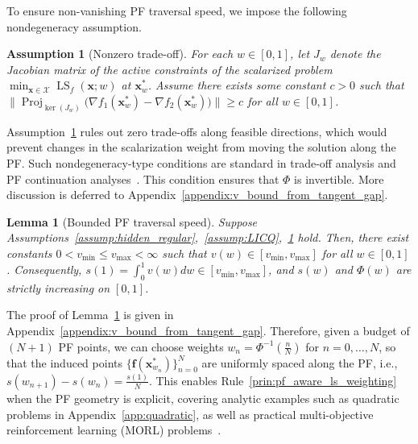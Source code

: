 \documentclass{article}
\newtheorem{assumption}{Assumption}
\newtheorem{lemma}{Lemma}
\newcommand{\bx}{\mathbf{x}}
\newcommand{\X}{\mathcal{X}}
\newcommand{\LS}{\operatorname{LS}}
\newcommand{\f}{\mathbf{f}}
\newcommand{\Farc}{\Phi}
\newcommand{\Proj}{\operatorname{Proj}}
\begin{document}
To ensure non-vanishing PF traversal speed, we impose the following nondegeneracy assumption.
\begin{assumption}[Nonzero trade-off]
\label{assump:tangent_gap}
For each $w\in[0,1]$, let $J_w$ denote the Jacobian matrix of the active constraints of the scalarized problem $\min_{\bx\in\X}\LS_f(\bx;w)$ at $\bx_w^*$. Assume there exists some constant $c>0$ such that $\big\| \Proj_{\ker(J_w)}\big(\nabla f_1(\bx_w^*)-\nabla f_2(\bx_w^*)\big)\big\|\ge c$ for all $w\in[0,1]$.
\end{assumption}
Assumption~\ref{assump:tangent_gap} rules out zero trade-offs along feasible directions, which would prevent changes in the scalarization weight from moving the solution along the PF. Such nondegeneracy-type conditions are standard in trade-off analysis and PF continuation analyses~\citep{eskelinen2012trade,bolten2021tracing}. This condition ensures that $\Farc$ is invertible. More discussion is deferred to Appendix~\ref{appendix:v_bound_from_tangent_gap}. 
\begin{lemma}[Bounded PF traversal speed]
\label{lem:v_bound_from_tangent_gap}
Suppose Assumptions~\ref{assump:hidden_regular},~\ref{assump:LICQ},~\ref{assump:tangent_gap} hold. Then, there exist constants $0<v_{\min}\le v_{\max}<\infty$ such that $v(w)\in [v_{\min},v_{\max}]$ for all $w\in[0,1]$. Consequently, $s(1)=\int_0^1 v(w) dw\in [v_{\min},v_{\max}]$, and $s(w)$ and $\Farc(w)$ are strictly increasing on $[0,1]$.
\end{lemma}
The proof of Lemma~\ref{lem:v_bound_from_tangent_gap} is given in Appendix~\ref{appendix:v_bound_from_tangent_gap}. Therefore, given a budget of $(N+1)$ PF points, we can choose weights $w_n=\Farc^{-1}\left(\frac{n}{N}\right)$ for $n=0,\ldots,N$, so that the induced points $\{\f(\bx_{w_n}^*)\}_{n=0}^N$ are uniformly spaced along the PF, i.e., $s(w_{n+1})-s(w_n)=\frac{s(1)}{N}$. 
This enables Rule~\ref{prin:pf_aware_ls_weighting} when the PF geometry is explicit, covering analytic examples such as quadratic problems in Appendix~\ref{app:quadratic}, as well as practical multi-objective reinforcement learning (MORL) problems~\citep{roijers2013survey,zhou2024beyond}. 
\end{document}
